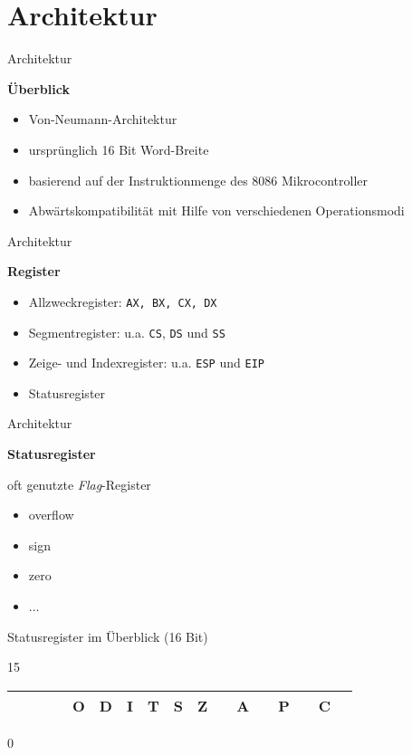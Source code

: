 \section{Architektur}

\begin{frame}{Architektur}
	\begin{center}
	\textbf{Überblick}
	\end{center}

	\begin{itemize}
		\item Von-Neumann-Architektur
		\item ursprünglich 16 Bit Word-Breite
		\item basierend auf der Instruktionmenge des 8086 Mikrocontroller
		\item Abwärtskompatibilität mit Hilfe von verschiedenen Operationsmodi
	\end{itemize}
\end{frame}


\begin{frame}{Architektur}
	\begin{center}
	\textbf{Register}
	\end{center}

	\begin{itemize}
		\item Allzweckregister: \texttt{AX, BX, CX, DX}
		\item Segmentregister: u.a. \texttt{CS}, \texttt{DS} und \texttt{SS}
		\item Zeige- und Indexregister: u.a. \texttt{ESP} und \texttt{EIP}   
		\item Statusregister
	\end{itemize}
\end{frame}


\begin{frame}{Architektur}
	\begin{center}
	\textbf{Statusregister}
	\end{center}

	oft genutzte \textit{Flag}-Register
	\begin{itemize}
		\item overflow
		\item sign
		\item zero
		\item ...
	\end{itemize}

	\makebox{}

	Statusregister im Überblick (16 Bit)
	\begin{center}
		{\small 15}
		\begin{tabular}{|c|c|c|c|c|c|c|c|c|c|c|c|c|c|c|c|c|}
		\hline & & & & O & D & I & T & S & Z & & A & & P & & C \\
		\hline
		\end{tabular}
		{\small 0}
	\end{center}
\end{frame}

